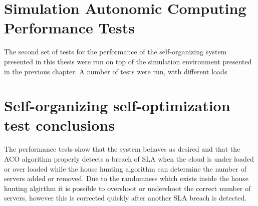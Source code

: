 \section{Simulation Autonomic Computing Performance Tests}

The second set of tests for the performance of the self-organizing system presented in this thesis were run on top of the simulation environment presented in the previous chapter. A number of tests were run, with different loads


\section{Self-organizing self-optimization test conclusions}

The performance tests show that the system behaves as desired and that the ACO algorithm properly detects a breach of SLA when the cloud is under loaded or over loaded while the house hunting algorithm can determine the number of servers added or removed. Due to the randomness which exists inside the house hunting algirthm it is possible to overshoot or undershoot the correct number of servers, however this is corrected quickly after another SLA breach is detected.
